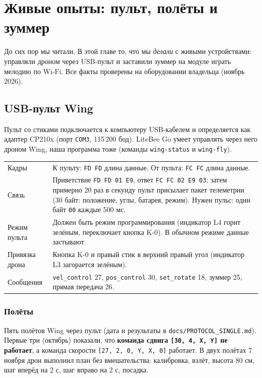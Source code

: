 \chapter{Живые опыты: пульт, полёты и зуммер}\label{ch:pult}

До сих пор мы читали. В этой главе то, что мы \emph{делали} с живыми устройствами: управляли дроном через USB-пульт и заставили зуммер на модуле играть мелодию по Wi-Fi. Все факты проверены на оборудовании владельца (ноябрь 2026).

\section{USB-пульт Wing}

Пульт со стиками подключается к компьютеру USB-кабелем и определяется как адаптер CP210x (порт \texttt{COM3}, 115\,200 бод). LiteBee Go умеет управлять через него дроном Wing, наша программа тоже (команды \texttt{wing-status} и \texttt{wing-fly}). \pr{}

\begin{tabularx}{\textwidth}{@{}p{3.6cm} Y@{}}
\toprule
{} &  \\ \midrule
Кадры & К пульту: \texttt{FD FD} длина данные. От пульта: \texttt{FC FC} длина данные. \\
Связь & Приветствие \texttt{FD FD 01 E9}, ответ \texttt{FC FC 02 E9 03}; затем примерно 20 раз в секунду пульт присылает пакет телеметрии (30 байт: положение, углы, батарея, режим). Нужен пульс: один байт \texttt{00} каждые 500 мс. \\
Режим пульта & Должен быть режим программирования (индикатор L4 горит зелёным, переключает кнопка K-0). В обычном режиме данные застывают. \\
Привязка дрона & Кнопка K-0 и правый стик в верхний правый угол (индикатор L3 загорается зелёным). \\
Сообщения & \texttt{vel\_control} 27, \texttt{pos\_control} 30, \texttt{set\_rotate} 18, зуммер 25, прямая передача 26. \\ \bottomrule
\end{tabularx}

\subsection*{Полёты}

Пять полётов Wing через пульт (дата и результаты в \texttt{docs/PROTOCOL\_SINGLE.md}). Первые три (октябрь) показали, что \textbf{команда сдвига \texttt{[30, 4, X, Y]} не работает}, а команда скорости \texttt{[27, 2, 0, Y, X, 0]} работает. В двух полётах 7 ноября дрон выполнил план без вмешательства: калибровка, взлёт, высота 80 см, шаг вперёд на 2 с, шаг вправо на 2 с, посадка. \pr{}

